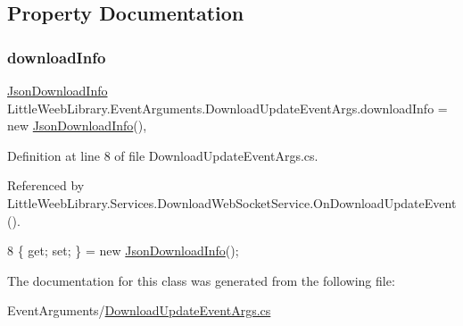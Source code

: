 \subsection{Property Documentation}
\mbox{\label{class_little_weeb_library_1_1_event_arguments_1_1_download_update_event_args_a6f920facf63fcef57167ccf645ed42bf}} 
\subsubsection{\texorpdfstring{download\+Info}{downloadInfo}}
{\footnotesize\ttfamily \mbox{\hyperlink{class_little_weeb_library_1_1_models_1_1_json_download_info}{Json\+Download\+Info}} Little\+Weeb\+Library.\+Event\+Arguments.\+Download\+Update\+Event\+Args.\+download\+Info = new \mbox{\hyperlink{class_little_weeb_library_1_1_models_1_1_json_download_info}{Json\+Download\+Info}}()\hspace{0.3cm}{\ttfamily [get]}, {\ttfamily [set]}}



Definition at line 8 of file Download\+Update\+Event\+Args.\+cs.



Referenced by Little\+Weeb\+Library.\+Services.\+Download\+Web\+Socket\+Service.\+On\+Download\+Update\+Event().


\begin{DoxyCode}
8 \{ \textcolor{keyword}{get}; \textcolor{keyword}{set}; \} = \textcolor{keyword}{new} \mbox{\hyperlink{class_little_weeb_library_1_1_models_1_1_json_download_info}{JsonDownloadInfo}}();
\end{DoxyCode}


The documentation for this class was generated from the following file\+:\begin{DoxyCompactItemize}
\item 
Event\+Arguments/\mbox{\hyperlink{_download_update_event_args_8cs}{Download\+Update\+Event\+Args.\+cs}}\end{DoxyCompactItemize}

